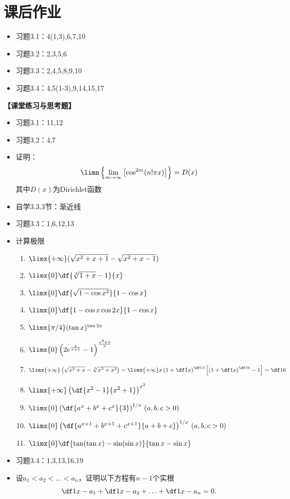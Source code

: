 \section*{课后作业}

\begin{itemize}
  \item 习题3.1：4(1,3),6,7,10
  \item 习题3.2：2,3,5,6
  \item 习题3.3：2,4,5,8,9,10
  \item 习题3.4：4,5(1-3),9,14,15,17
\end{itemize}

{\bf 【课堂练习与思考题】}
\begin{itemize}
  \item 习题3.1：11,12
  \item 习题3.2：4,7
  \item 证明：$$\limn\left\{\lim\limits_{m\to\infty}\left[\cos^{2m}(n!\pi
	x)\right]\right\}=D(x)$$
	其中$D(x)$为Dirichlet函数
  \item 自学3.3.3节：渐近线 
  \item 习题3.3：1,6,12,13
  \item  计算极限
	\begin{enumerate}[(1)]
	  \item $\limx{+\infty}(\sqrt{x^2+x+1}-\sqrt{x^2+x-1})$ 
	  \item $\limx{0}\df{\sqrt[3]{1+x}-1}{x}$ 
	  \item $\limx{0}\df{\sqrt{1-\cos x^2}}{1-\cos x}$ 
	  \item $\limx{0}\df{1-\cos x\cos 2x}{1-\cos x}$
	  \item $\limx{\pi /4}(\tan x)^{\tan 2x}$ 
	  \item $\limx{0}\left(2e^{\frac{x}{x+1}}-1\right)^{\frac{x^2+1}{x}}$ 
	  \item $\limx{+\infty}\left(\sqrt{x^2+x}-\sqrt[3]{x^3+x^2}\right)=
	  \limx{+\infty}x\left(1+\df1x\right)^{\df13}\left[\left(
	  1+\df1x\right)^{\df16}-1\right]=\df16$ 
	  \item $\limx{+\infty}\left(\df{x^2-1}{x^2+1}\right)^{x^2}$
	  \item $\limx{0}\left(\df{a^x+b^x+c^x}{3}\right)^{1/x}\,(a,b,c>0)$ 
	  \item $\limx{0}\left(\df{a^{x+1}+b^{x+1}+c^{x+1}}{a+b+c}\right)^{1/x}
	  \,(a,b,c>0)$ 
	  \item $\limx{0}\df{\tan(\tan x)-\sin(\sin x)}{\tan x-\sin x}$
	\end{enumerate}
  \item 习题3.4：1,3,13,16,19
  \item 设$a_1<a_2<\ldots<a_n$，证明以下方程有$n-1$个实根
	$$\df 1{x-a_1}+\df 1{x-a_2}+\ldots+\df 1{x-a_n}=0.$$
\end{itemize}